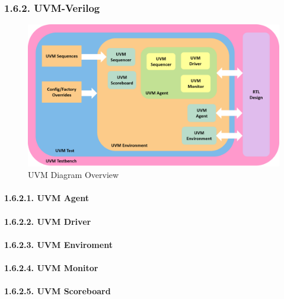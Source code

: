 \documentclass[
]{article}
\begin{document}
\hypertarget{uvm-verilog-1}{%
\subsubsection{1.6.2. UVM-Verilog}\label{uvm-verilog-1}}

\begin{figure}
\centering
\includegraphics{../bench/uvm-testbench.png}
\caption{UVM Diagram Overview}
\end{figure}

\hypertarget{uvm-agent-1}{%
\paragraph{1.6.2.1. UVM Agent}\label{uvm-agent-1}}

\hypertarget{uvm-driver-1}{%
\paragraph{1.6.2.2. UVM Driver}\label{uvm-driver-1}}

\hypertarget{uvm-enviroment-1}{%
\paragraph{1.6.2.3. UVM Enviroment}\label{uvm-enviroment-1}}

\hypertarget{uvm-monitor-1}{%
\paragraph{1.6.2.4. UVM Monitor}\label{uvm-monitor-1}}

\hypertarget{uvm-scoreboard-1}{%
\paragraph{1.6.2.5. UVM Scoreboard}\label{uvm-scoreboard-1}}
\end{document}
